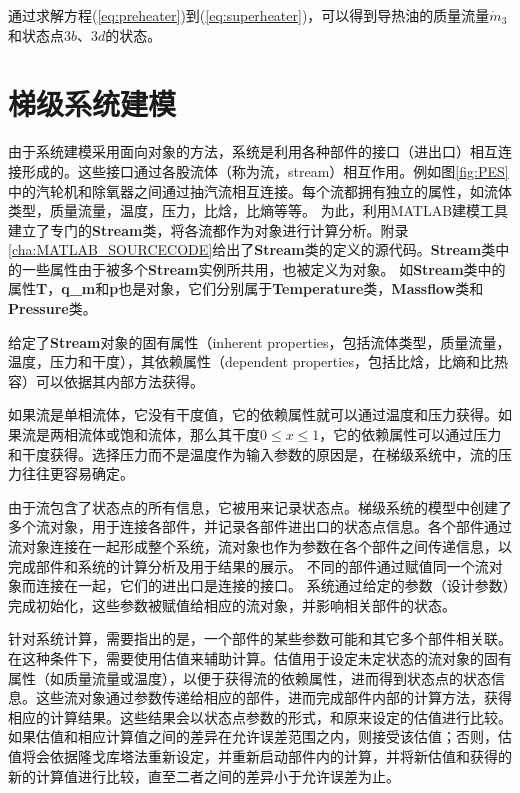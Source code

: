 通过求解方程(\ref{eq:preheater})到(\ref{eq:superheater})，可以得到导热油的质量流量$\dot{m}_3$和状态点$3b$、$3d$的状态。

\section{梯级系统建模}

由于系统建模采用面向对象的方法，系统是利用各种部件的接口（进出口）相互连接形成的。这些接口通过各股流体（称为流，stream）相互作用。例如图\ref{fig:PES}中的汽轮机和除氧器之间通过抽汽流相互连接。每个流都拥有独立的属性，如流体类型，质量流量，温度，压力，比焓，比熵等等。
为此，利用MATLAB建模工具建立了专门的\textbf{Stream}类，将各流都作为对象进行计算分析。附录\ref{cha:MATLAB_SOURCECODE}给出了\textbf{Stream}类的定义的源代码。\textbf{Stream}类中的一些属性由于被多个\textbf{Stream}实例所共用，也被定义为对象。
如\textbf{Stream}类中的属性\textbf{T}，\textbf{q\_m}和\textbf{p}也是对象，它们分别属于\textbf{Temperature}类，\textbf{Massflow}类和\textbf{Pressure}类。

给定了\textbf{Stream}对象的固有属性（inherent properties，包括流体类型，质量流量，温度，压力和干度），其依赖属性（dependent properties，包括比焓，比熵和比热容）可以依据其内部方法获得。

如果流是单相流体，它没有干度值，它的依赖属性就可以通过温度和压力获得。如果流是两相流体或饱和流体，那么其干度$0 \leqslant x \leqslant 1$，它的依赖属性可以通过压力和干度获得。选择压力而不是温度作为输入参数的原因是，在梯级系统中，流的压力往往更容易确定。

由于流包含了状态点的所有信息，它被用来记录状态点。梯级系统的模型中创建了多个流对象，用于连接各部件，并记录各部件进出口的状态点信息。各个部件通过流对象连接在一起形成整个系统，流对象也作为参数在各个部件之间传递信息，以完成部件和系统的计算分析及用于结果的展示。
不同的部件通过赋值同一个流对象而连接在一起，它们的进出口是连接的接口。
系统通过给定的参数（设计参数）完成初始化，这些参数被赋值给相应的流对象，并影响相关部件的状态。

针对系统计算，需要指出的是，一个部件的某些参数可能和其它多个部件相关联。
在这种条件下，需要使用估值来辅助计算。估值用于设定未定状态的流对象的固有属性（如质量流量或温度），以便于获得流的依赖属性，进而得到状态点的状态信息。这些流对象通过参数传递给相应的部件，进而完成部件内部的计算方法，获得相应的计算结果。这些结果会以状态点参数的形式，和原来设定的估值进行比较。如果估值和相应计算值之间的差异在允许误差范围之内，则接受该估值；否则，估值将会依据隆戈库塔法重新设定，并重新启动部件内的计算，并将新估值和获得的新的计算值进行比较，直至二者之间的差异小于允许误差为止。

